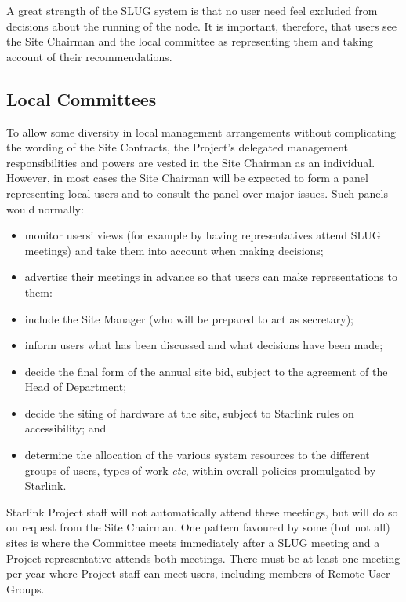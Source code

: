 \documentclass[twoside,11pt]{article}
\begin{document}
A great strength of the SLUG system is that no user need feel excluded from
decisions about the running of the node.  It is important, therefore,
that users see the Site Chairman and the local committee as representing
them and taking account of their recommendations.

\subsection{Local Committees}

To allow some diversity in local management arrangements without
complicating the wording of the Site Contracts, the
Project's delegated management responsibilities and powers are vested
in the Site Chairman as an individual.  However, in most
cases the Site Chairman will be expected to form a panel representing
local users and to consult the panel over major issues.  Such panels
would normally:
\begin{itemize}
\item monitor users' views (for example by having representatives
      attend SLUG meetings)
      and take them into account when making decisions;
\item advertise their meetings in advance so that users can make
      representations to them:
\item include the Site Manager (who will be prepared to act as secretary);
\item inform users what has been discussed and what decisions have been made;
\item decide the final form of the annual site bid, subject to the
      agreement of the Head of Department;
\item decide the siting of hardware at the site, subject to Starlink
      rules on accessibility; and
\item determine the allocation of the various system resources to
      the different groups of users, types of work {\it etc},
      within overall policies promulgated by Starlink.
\end{itemize}
Starlink Project staff will not automatically attend these meetings,
but will do so on request from the Site Chairman.  One pattern
favoured by some (but not all) sites is where the Committee meets
immediately after a SLUG meeting and a Project representative
attends both meetings.  There must be at least one meeting per
year where Project staff can meet users, including members of
Remote User Groups.

\pagebreak
\end{document}
